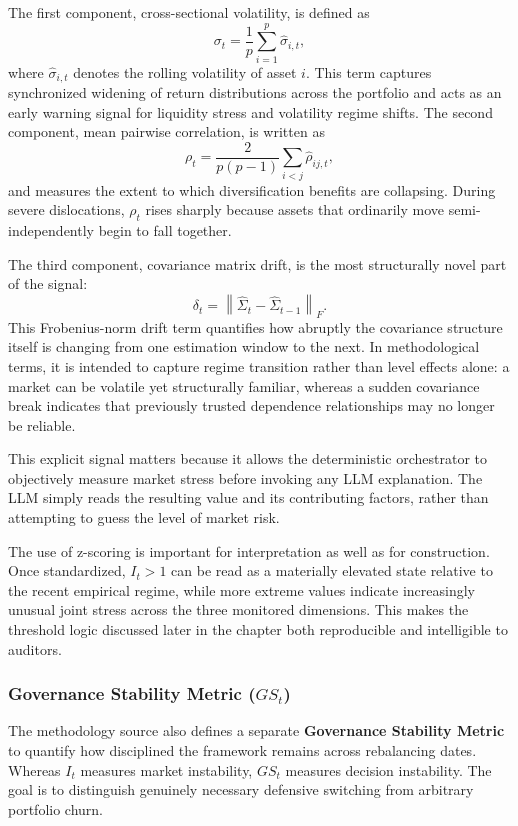 \documentclass[11pt]{article}
\begin{document}
The first component, cross-sectional volatility, is defined as
\begin{equation}
\label{eq:sigma-component}
\sigma_t = \frac{1}{p} \sum_{i=1}^{p} \hat{\sigma}_{i,t},
\end{equation}
where $\hat{\sigma}_{i,t}$ denotes the rolling volatility of asset $i$. This term captures synchronized widening of return distributions across the portfolio and acts as an early warning signal for liquidity stress and volatility regime shifts. The second component, mean pairwise correlation, is written as
\begin{equation}
\label{eq:rho-component}
\rho_t = \frac{2}{p(p-1)} \sum_{i<j} \hat{\rho}_{ij,t},
\end{equation}
and measures the extent to which diversification benefits are collapsing. During severe dislocations, $\rho_t$ rises sharply because assets that ordinarily move semi-independently begin to fall together.

The third component, covariance matrix drift, is the most structurally novel part of the signal:
\begin{equation}
\label{eq:delta-component}
\delta_t = \left\lVert \hat{\Sigma}_t - \hat{\Sigma}_{t-1} \right\rVert_F.
\end{equation}
This Frobenius-norm drift term quantifies how abruptly the covariance structure itself is changing from one estimation window to the next. In methodological terms, it is intended to capture regime transition rather than level effects alone: a market can be volatile yet structurally familiar, whereas a sudden covariance break indicates that previously trusted dependence relationships may no longer be reliable.

This explicit signal matters because it allows the deterministic orchestrator to objectively measure market stress before invoking any LLM explanation. The LLM simply reads the resulting value and its contributing factors, rather than attempting to guess the level of market risk.

The use of z-scoring is important for interpretation as well as for construction. Once standardized, $I_t > 1$ can be read as a materially elevated state relative to the recent empirical regime, while more extreme values indicate increasingly unusual joint stress across the three monitored dimensions. This makes the threshold logic discussed later in the chapter both reproducible and intelligible to auditors.

\subsubsection{Governance Stability Metric ($GS_t$)}
The methodology source also defines a separate \textbf{Governance Stability Metric} to quantify how disciplined the framework remains across rebalancing dates. Whereas $I_t$ measures market instability, $GS_t$ measures decision instability. The goal is to distinguish genuinely necessary defensive switching from arbitrary portfolio churn.
\end{document}
